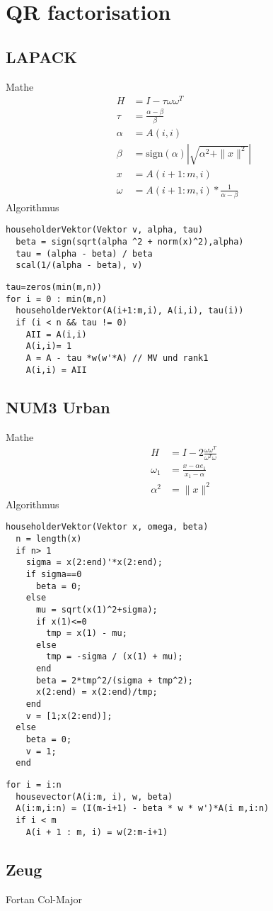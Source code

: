 \chapter{QR factorisation}

\section{LAPACK}
Mathe \cite{DGEQR2}
\begin{align}
	H &= I - \tau \omega \omega^T \\
	\tau &= \frac{\alpha - \beta}{\beta} \\
	\alpha &= A(i,i)\\
	\beta &= \text{sign}(\alpha) \left|\sqrt{\alpha^2 + \|x\|^2}\right|\\
	x &= A(i+1:m,i)\\
	\omega &= A(i+1:m,i) * \frac{1}{\alpha - \beta}
\end{align}
Algorithmus
\begin{lstlisting}
householderVektor(Vektor v, alpha, tau)
  beta = sign(sqrt(alpha ^2 + norm(x)^2),alpha)
  tau = (alpha - beta) / beta	
  scal(1/(alpha - beta), v)
\end{lstlisting}
\begin{lstlisting}
tau=zeros(min(m,n))
for i = 0 : min(m,n)
  householderVektor(A(i+1:m,i), A(i,i), tau(i)) 
  if (i < n && tau != 0)
    AII = A(i,i)
    A(i,i)= 1
    A = A - tau *w(w'*A) // MV und rank1
    A(i,i) = AII
\end{lstlisting}

\section{NUM3 Urban}
Mathe
\begin{align}
	H &= I - 2 \frac{\omega \omega^T}{\omega^T \omega}\\
	\omega_1 &= \frac{x - \alpha e_1}{x_1 - \alpha}\\
	\alpha ^2 &= \|x\|^2 
\end{align}
Algorithmus
\begin{lstlisting}
householderVektor(Vektor x, omega, beta)
  n = length(x)
  if n> 1
    sigma = x(2:end)'*x(2:end);
    if sigma==0
      beta = 0;
    else
      mu = sqrt(x(1)^2+sigma);
      if x(1)<=0
        tmp = x(1) - mu;
      else
        tmp = -sigma / (x(1) + mu);
      end
      beta = 2*tmp^2/(sigma + tmp^2);
      x(2:end) = x(2:end)/tmp;
    end
    v = [1;x(2:end)];
  else
    beta = 0;
    v = 1;
  end
\end{lstlisting}

\begin{lstlisting}
for i = i:n
  housevector(A(i:m, i), w, beta)
  A(i:m,i:n) = (I(m-i+1) - beta * w * w')*A(i m,i:n)
  if i < m
    A(i + 1 : m, i) = w(2:m-i+1)
\end{lstlisting}



\section{Zeug}

Fortan Col-Major

